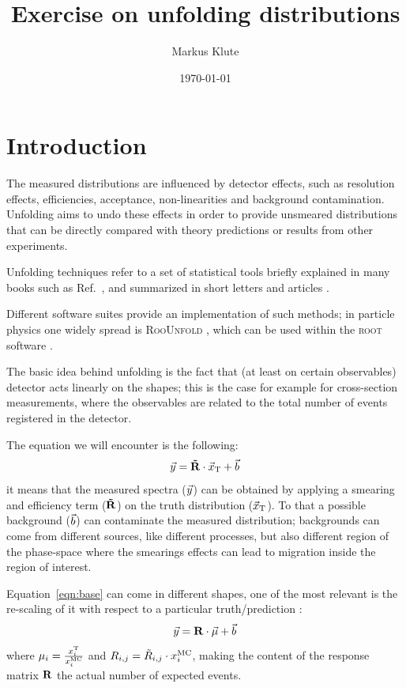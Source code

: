 \documentclass[a4paper,11pt]{article}
\title{Exercise on unfolding distributions}
\author{Markus Klute}
\date{\today}
\begin{document}
\maketitle

\section*{Introduction}
The measured distributions are influenced by detector effects, such as resolution effects, efficiencies, 
acceptance, non-linearities and background contamination.
Unfolding aims to undo these effects in order to provide unsmeared distributions that can be directly compared with theory predictions 
or results from other experiments.

Unfolding techniques refer to a set of statistical tools briefly explained in many books such as Ref.~\cite{Cowan}, 
and summarized in short letters and articles \cite{Cowan:unfolding}. 

Different software suites provide an implementation of such methods; 
in particle physics one widely spread is {\scshape RooUnfold} \cite{RooUnfold}, 
which can be used within the {\scshape root} software \cite{ROOT}. 

The basic idea behind unfolding is the fact that (at least on certain observables) detector acts linearly on the shapes; 
this is the case for example for cross-section measurements, 
where the observables are related to the total number of events registered in the detector.

The equation we will encounter is the following:
\begin{equation}
	\vec{y}= \mathbf{\tilde{R}} \cdot \vec{x}_\textup{T} + \vec{b}
	\label{eqn:base}
\end{equation}
it means that the measured spectra ($\vec{y}$) can be obtained by applying a smearing and efficiency term ($\mathbf{\tilde{R}}$) on the truth distribution ($\vec{x}_\textup{T}$). 
To that a possible background ($\vec{b}$) can contaminate the measured distribution;
backgrounds can come from different sources, 
like different processes, but also different region of the phase-space 
where the smearings effects can lead to migration inside the region of interest.

Equation~\ref{eqn:base} can come in different shapes, 
one of the most relevant is the re-scaling of it with respect to a particular truth/prediction \cite{SVD}:
\begin{equation}
	\vec{y} = \mathbf{R} \cdot \vec{\mu} + \vec{b}
\end{equation}
where $\mu_{i} = \frac{x^\textup{T}_{i}}{x^\textup{MC}_{i}} $ and  $R_{i,j} = \tilde{R}_{i,j} \cdot x^\textup{MC}_{i} $, 
making the content of the response matrix $\mathbf{R}$ the actual number of expected events.
\end{document}
